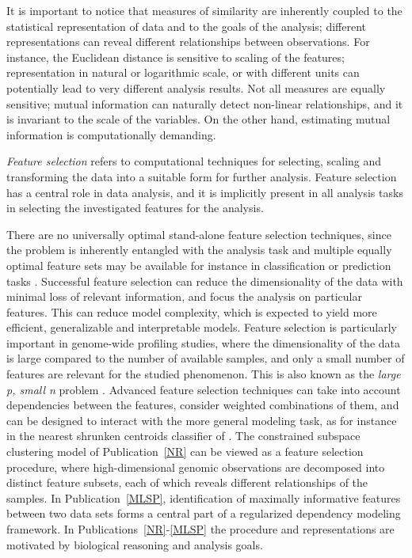 It is important to notice that measures of similarity are inherently
coupled to the statistical representation of data and to the goals of
the analysis; different representations can reveal different
relationships between observations. For instance, the Euclidean
distance is sensitive to scaling of the features; representation in
natural or logarithmic scale, or with different units can potentially
lead to very different analysis results. Not all measures are equally
sensitive; mutual information can naturally detect non-linear
relationships, and it is invariant to the scale of the variables. On
the other hand, estimating mutual information is computationally
demanding.

{\it Feature selection} refers to computational techniques for
selecting, scaling and transforming the data into a suitable form for
further analysis. Feature selection has a central role in data
analysis, and it is implicitly present in all analysis tasks in
selecting the investigated features for the analysis. 

There are no universally optimal stand-alone feature selection
techniques, since the problem is inherently entangled with the
analysis task and multiple equally optimal feature sets may be
available for instance in classification or prediction tasks
\cite{Guyon03, Saeys2007}. Successful feature selection can reduce the
dimensionality of the data with minimal loss of relevant information,
and focus the analysis on particular features. This can reduce model
complexity, which is expected to yield more efficient, generalizable
and interpretable models. Feature selection is particularly important
in genome-wide profiling studies, where the dimensionality of the data
is large compared to the number of available samples, and only a small
number of features are relevant for the studied phenomenon. This is
also known as the {\it large p, small n} problem \citep{West03}.
Advanced feature selection techniques can take into account
dependencies between the features, consider weighted combinations of
them, and can be designed to interact with the more general modeling
task, as for instance in the nearest shrunken centroids classifier of
\cite{Tibshirani02}. The constrained subspace clustering model of
Publication~\ref{NR} can be viewed as a feature selection procedure,
where high-dimensional genomic observations are decomposed into
distinct feature subsets, each of which reveals different
relationships of the samples. In Publication~\ref{MLSP},
identification of maximally informative features between two data sets
forms a central part of a regularized dependency modeling
framework. In Publications~\ref{NR}-\ref{MLSP} the procedure and
representations are motivated by biological reasoning and analysis
goals.

